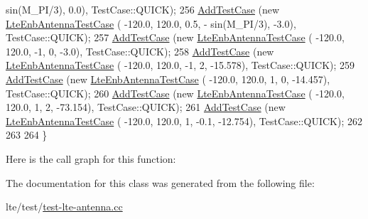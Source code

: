 \begin{DoxyCode}
      sin(M\_PI/3),       0.0), TestCase::QUICK);
256   \hyperlink{classns3_1_1TestCase_a3718088e3eefd5d6454569d2e0ddd835}{AddTestCase} (\textcolor{keyword}{new} \hyperlink{classLteEnbAntennaTestCase}{LteEnbAntennaTestCase} (    -120.0,    120.0,    0.5, -
      sin(M\_PI/3),      -3.0), TestCase::QUICK);
257   \hyperlink{classns3_1_1TestCase_a3718088e3eefd5d6454569d2e0ddd835}{AddTestCase} (\textcolor{keyword}{new} \hyperlink{classLteEnbAntennaTestCase}{LteEnbAntennaTestCase} (    -120.0,    120.0,     -1,    
              0,      -3.0), TestCase::QUICK);
258   \hyperlink{classns3_1_1TestCase_a3718088e3eefd5d6454569d2e0ddd835}{AddTestCase} (\textcolor{keyword}{new} \hyperlink{classLteEnbAntennaTestCase}{LteEnbAntennaTestCase} (    -120.0,    120.0,     -1,    
              2,   -15.578), TestCase::QUICK);
259   \hyperlink{classns3_1_1TestCase_a3718088e3eefd5d6454569d2e0ddd835}{AddTestCase} (\textcolor{keyword}{new} \hyperlink{classLteEnbAntennaTestCase}{LteEnbAntennaTestCase} (    -120.0,    120.0,      1,    
              0,   -14.457), TestCase::QUICK);
260   \hyperlink{classns3_1_1TestCase_a3718088e3eefd5d6454569d2e0ddd835}{AddTestCase} (\textcolor{keyword}{new} \hyperlink{classLteEnbAntennaTestCase}{LteEnbAntennaTestCase} (    -120.0,    120.0,      1,    
              2,   -73.154), TestCase::QUICK);
261   \hyperlink{classns3_1_1TestCase_a3718088e3eefd5d6454569d2e0ddd835}{AddTestCase} (\textcolor{keyword}{new} \hyperlink{classLteEnbAntennaTestCase}{LteEnbAntennaTestCase} (    -120.0,    120.0,      1,    
           -0.1,   -12.754), TestCase::QUICK);
262 
263 
264 \}
\end{DoxyCode}


Here is the call graph for this function\+:




The documentation for this class was generated from the following file\+:\begin{DoxyCompactItemize}
\item 
lte/test/\hyperlink{test-lte-antenna_8cc}{test-\/lte-\/antenna.\+cc}\end{DoxyCompactItemize}
